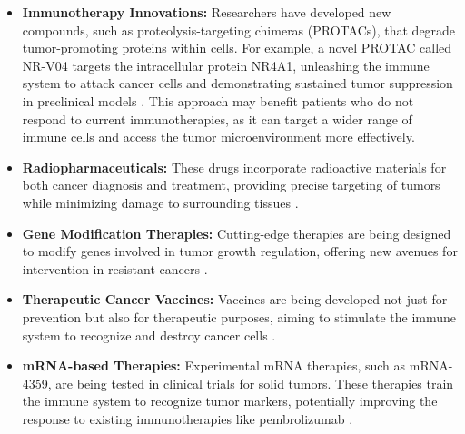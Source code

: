 \begin{itemize}
    \item \textbf{Immunotherapy Innovations:} Researchers have developed new compounds, such as 
    proteolysis-targeting chimeras (PROTACs), that degrade tumor-promoting proteins within cells. 
    For example, a novel PROTAC called NR-V04 targets the intracellular protein NR4A1, unleashing 
    the immune system to attack cancer cells and demonstrating sustained tumor suppression in 
    preclinical models \cite{aiOncology2025}. This approach may benefit patients who do not respond 
    to current immunotherapies, as it can target a wider range of immune cells and access the tumor 
    microenvironment more effectively.

    \item \textbf{Radiopharmaceuticals:} These drugs incorporate radioactive materials for both 
    cancer diagnosis and treatment, providing precise targeting of tumors while minimizing damage to 
    surrounding tissues \cite{mrnaTherapy2025}.

    \item \textbf{Gene Modification Therapies:} Cutting-edge therapies are being designed to modify 
    genes involved in tumor growth regulation, offering new avenues for intervention in resistant 
    cancers \cite{mrnaTherapy2025}.

    \item \textbf{Therapeutic Cancer Vaccines:} Vaccines are being developed not just for prevention 
    but also for therapeutic purposes, aiming to stimulate the immune system to recognize and 
    destroy cancer cells \cite{mrnaTherapy2025}.

    \item \textbf{mRNA-based Therapies:} Experimental mRNA therapies, such as mRNA-4359, are being 
    tested in clinical trials for solid tumors. These therapies train the immune system to recognize 
    tumor markers, potentially improving the response to existing immunotherapies like 
    pembrolizumab \cite{nlmCitingMedicine2007}.
\end{itemize}

